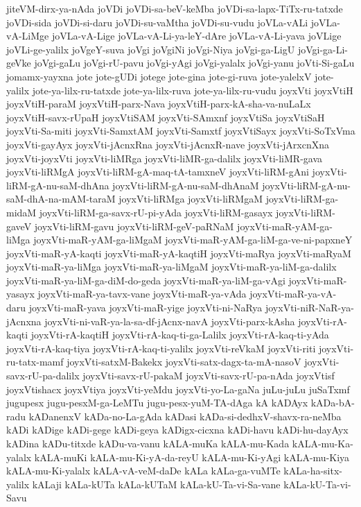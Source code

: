 {jiteVM-dirx-ya-nAda
joVDi
joVDi-sa-beV-keMba
joVDi-sa-lapx-TiTx-ru-tatxde
joVDi-sida
joVDi-si-daru
joVDi-su-vaMtha
joVDi-su-vudu
joVLa-vALi
joVLa-vA-LiMge
joVLa-vA-Lige
joVLa-vA-Li-ya-leY-dAre
joVLa-vA-Li-yava
joVLige
joVLi-ge-yalilx
joVgeY-suva
joVgi
joVgiNi
joVgi-Niya
joVgi-ga-LigU
joVgi-ga-Li-geVke
joVgi-gaLu
joVgi-rU-pavu
joVgi-yAgi
joVgi-yalalx
joVgi-yanu
joVti-Si-gaLu
jomamx-yayxna
jote
jote-gUDi
jotege
jote-gina
jote-gi-ruva
jote-yalelxV
jote-yalilx
jote-ya-lilx-ru-tatxde
jote-ya-lilx-ruva
jote-ya-lilx-ru-vudu
joyxVti
joyxVtiH
joyxVtiH-paraM
joyxVtiH-parx-Nava
joyxVtiH-parx-kA-sha-va-nuLaLx
joyxVtiH-savx-rUpaH
joyxVtiSAM
joyxVti-SAmxnf
joyxVtiSa
joyxVtiSaH
joyxVti-Sa-miti
joyxVti-SamxtAM
joyxVti-Samxtf
joyxVtiSayx
joyxVti-SoTxVma
joyxVti-gayAyx
joyxVti-jAcnxRna
joyxVti-jAcnxR-nave
joyxVti-jArxcnXna
joyxVti-joyxVti
joyxVti-liMRga
joyxVti-liMR-ga-dalilx
joyxVti-liMR-gava
joyxVti-liRMgA
joyxVti-liRM-gA-maq-tA-tamxneV
joyxVti-liRM-gAni
joyxVti-liRM-gA-nu-saM-dhAna
joyxVti-liRM-gA-nu-saM-dhAnaM
joyxVti-liRM-gA-nu-saM-dhA-na-mAM-taraM
joyxVti-liRMga
joyxVti-liRMgaM
joyxVti-liRM-ga-midaM
joyxVti-liRM-ga-savx-rU-pi-yAda
joyxVti-liRM-gasayx
joyxVti-liRM-gaveV
joyxVti-liRM-gavu
joyxVti-liRM-geV-paRNaM
joyxVti-maR-yAM-ga-liMga
joyxVti-maR-yAM-ga-liMgaM
joyxVti-maR-yAM-ga-liM-ga-ve-ni-papxneY
joyxVti-maR-yA-kaqti
joyxVti-maR-yA-kaqtiH
joyxVti-maRya
joyxVti-maRyaM
joyxVti-maR-ya-liMga
joyxVti-maR-ya-liMgaM
joyxVti-maR-ya-liM-ga-dalilx
joyxVti-maR-ya-liM-ga-diM-do-geda
joyxVti-maR-ya-liM-ga-vAgi
joyxVti-maR-yasayx
joyxVti-maR-ya-tavx-vane
joyxVti-maR-ya-vAda
joyxVti-maR-ya-vA-daru
joyxVti-maR-yava
joyxVti-maR-yige
joyxVti-ni-NaRya
joyxVti-niR-NaR-ya-jAcnxna
joyxVti-ni-vaR-ya-la-sa-df-jAcnx-navA
joyxVti-parx-kAsha
joyxVti-rA-kaqti
joyxVti-rA-kaqtiH
joyxVti-rA-kaq-ti-ga-Lalilx
joyxVti-rA-kaq-ti-yAda
joyxVti-rA-kaq-tiya
joyxVti-rA-kaq-ti-yalilx
joyxVti-reVkaM
joyxVti-riti
joyxVti-ru-tatx-mamf
joyxVti-satxM-Bakekx
joyxVti-satx-dagx-ta-mA-nasoV
joyxVti-savx-rU-pa-dalilx
joyxVti-savx-rU-pakaM
joyxVti-savx-rU-pa-nAda
joyxVtisf
joyxVtishacx
joyxVtiya
joyxVti-yeMdu
joyxVti-yo-La-gaNa
juLu-juLu
juSaTxmf
jugupesx
jugu-pesxM-ga-LeMTu
jugu-pesx-yuM-TA-dAga
kA
kADAyx
kADa-bA-radu
kADanenxV
kADa-no-La-gAda
kADasi
kADa-si-dedhxV-shavx-ra-neMba
kADi
kADige
kADi-gege
kADi-geya
kADigx-cicxna
kADi-havu
kADi-hu-dayAyx
kADina
kADu-titxde
kADu-va-vanu
kALA-muKa
kALA-mu-Kada
kALA-mu-Ka-yalalx
kALA-muKi
kALA-mu-Ki-yA-da-reyU
kALA-mu-Ki-yAgi
kALA-mu-Kiya
kALA-mu-Ki-yalalx
kALA-vA-veM-daDe
kALa
kALa-ga-vuMTe
kALa-ha-sitx-yalilx
kALaji
kALa-kUTa
kALa-kUTaM
kALa-kU-Ta-vi-Sa-vane
kALa-kU-Ta-vi-Savu
}
